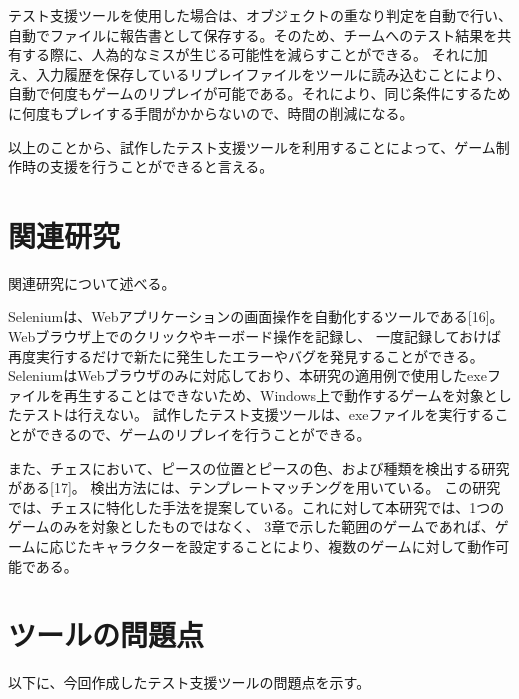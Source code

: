 テスト支援ツールを使用した場合は、オブジェクトの重なり判定を自動で行い、自動でファイルに報告書として保存する。そのため、チームへのテスト結果を共有する際に、人為的なミスが生じる可能性を減らすことができる。
それに加え、入力履歴を保存しているリプレイファイルをツールに読み込むことにより、自動で何度もゲームのリプレイが可能である。それにより、同じ条件にするために何度もプレイする手間がかからないので、時間の削減になる。

以上のことから、試作したテスト支援ツールを利用することによって、ゲーム制作時の支援を行うことができると言える。


\section{関連研究}

	関連研究について述べる。
	
	Seleniumは、Webアプリケーションの画面操作を自動化するツールである[16]。Webブラウザ上でのクリックやキーボード操作を記録し、
	一度記録しておけば再度実行するだけで新たに発生したエラーやバグを発見することができる。
	SeleniumはWebブラウザのみに対応しており、本研究の適用例で使用したexeファイルを再生することはできないため、Windows上で動作するゲームを対象としたテストは行えない。
	試作したテスト支援ツールは、exeファイルを実行することができるので、ゲームのリプレイを行うことができる。
	
	また、チェスにおいて、ピースの位置とピースの色、および種類を検出する研究がある[17]。
	検出方法には、テンプレートマッチングを用いている。
	この研究では、チェスに特化した手法を提案している。これに対して本研究では、1つのゲームのみを対象としたものではなく、
	3章で示した範囲のゲームであれば、ゲームに応じたキャラクターを設定することにより、複数のゲームに対して動作可能である。
	


\section{ツールの問題点}

以下に、今回作成したテスト支援ツールの問題点を示す。

